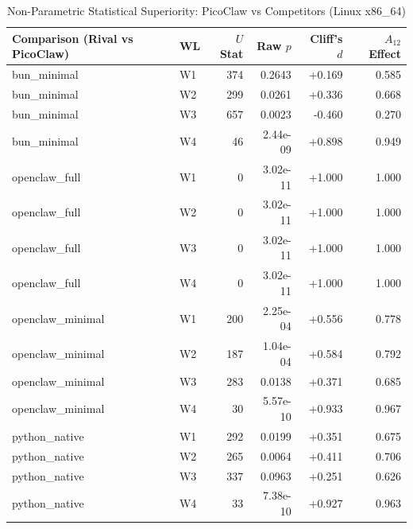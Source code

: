 \begin{table}[t]
\centering\small
\caption{Non-Parametric Statistical Superiority: PicoClaw vs Competitors (Linux x86_64)}
\label{tab:linux_stat_tests}
\begin{tabular}{llrrrr}
\toprule
Comparison (Rival vs PicoClaw) & WL & $U$ Stat & Raw $p$ & Cliff's $d$ & $A_{12}$ Effect \\
\midrule
bun\_minimal & W1 & 374 & 0.2643 & +0.169 & 0.585 \\
bun\_minimal & W2 & 299 & 0.0261 & +0.336 & 0.668 \\
bun\_minimal & W3 & 657 & 0.0023 & -0.460 & 0.270 \\
bun\_minimal & W4 & 46 & 2.44e-09 & +0.898 & 0.949 \\
openclaw\_full & W1 & 0 & 3.02e-11 & +1.000 & 1.000 \\
openclaw\_full & W2 & 0 & 3.02e-11 & +1.000 & 1.000 \\
openclaw\_full & W3 & 0 & 3.02e-11 & +1.000 & 1.000 \\
openclaw\_full & W4 & 0 & 3.02e-11 & +1.000 & 1.000 \\
openclaw\_minimal & W1 & 200 & 2.25e-04 & +0.556 & 0.778 \\
openclaw\_minimal & W2 & 187 & 1.04e-04 & +0.584 & 0.792 \\
openclaw\_minimal & W3 & 283 & 0.0138 & +0.371 & 0.685 \\
openclaw\_minimal & W4 & 30 & 5.57e-10 & +0.933 & 0.967 \\
python\_native & W1 & 292 & 0.0199 & +0.351 & 0.675 \\
python\_native & W2 & 265 & 0.0064 & +0.411 & 0.706 \\
python\_native & W3 & 337 & 0.0963 & +0.251 & 0.626 \\
python\_native & W4 & 33 & 7.38e-10 & +0.927 & 0.963 \\
\bottomrule
\end{tabular}
\end{table}
